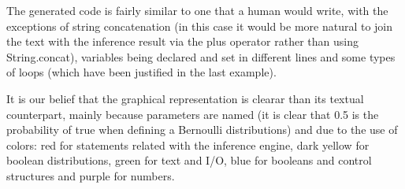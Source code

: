 The generated code is fairly similar to one that a human would
write, with the exceptions of string concatenation (in this case it would be more natural
to join the text with the inference result via the plus operator rather than
using String.concat), variables being declared and set in different lines and some
types of loops (which have been justified in the last example).

It is our belief that the graphical representation is clearar than its textual
counterpart, mainly because parameters are named (it is clear that 0.5 is the
probability of true when defining a Bernoulli distributions) and due to the use
of colors: red for statements related with
the inference engine, dark yellow for boolean distributions, green for text
and I/O, blue for booleans and control structures and purple for numbers.
